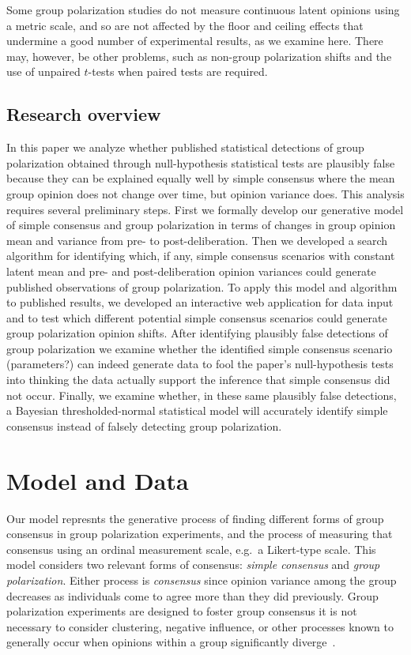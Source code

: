 \documentclass[11pt, letterpaper]{article}
\begin{document}
Some group polarization studies do not measure continuous latent opinions using
a metric scale, and so are not affected by the floor and ceiling effects that
undermine a good number of experimental results, as we examine here. There may,
however, be other problems, such as non-group polarization shifts and the use
of unpaired $t$-tests when paired tests are required.

\subsection{Research overview}

In this paper we analyze whether published statistical detections of group 
polarization obtained through null-hypothesis statistical tests
are plausibly false because they can be explained equally well by simple consensus
where the mean group opinion does not change over time, but opinion variance does.
This analysis requires several preliminary steps. 
First we formally develop our generative model of simple consensus and group 
polarization in terms of changes in group opinion mean and variance from 
pre- to post-deliberation. Then we developed a search algorithm for identifying 
which, if any, simple consensus scenarios with 
constant latent mean and pre- and post-deliberation opinion variances 
could generate published observations of group polarization. To apply this model
and algorithm to published results, we developed an interactive web application
for data input and to test which different potential simple consensus scenarios 
could generate group polarization opinion shifts. After identifying plausibly false
detections of group polarization we examine whether the identified simple
consensus scenario (parameters?) can indeed generate data to fool the 
paper's null-hypothesis tests into thinking the data actually support the inference
that simple consensus did not occur. Finally, we examine whether, in these same
plausibly false detections, a Bayesian thresholded-normal statistical model
will accurately identify simple consensus instead of falsely detecting group
polarization.

\section{Model and Data}

Our model represnts the generative process of finding different forms of group consensus
in group polarization experiments, and the process of measuring that consensus using
an ordinal measurement scale, e.g.\ a Likert-type scale. This model considers two
relevant forms of consensus: \emph{simple consensus} and \emph{group polarization}.
Either process is \emph{consensus} since opinion variance among the group 
decreases as individuals come to agree more than they did previously. 
Group polarization experiments are designed to foster group consensus
it is not necessary to consider clustering, negative influence, or other
processes known to generally occur when opinions within a group significantly
diverge~\cite{Turner2018}.
\end{document}
